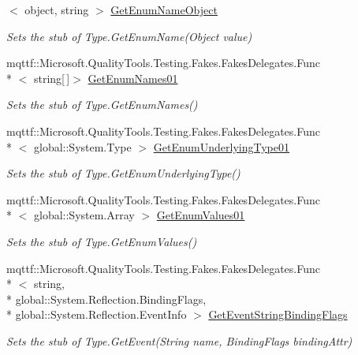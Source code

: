 \begin{DoxyCompactItemize}
$<$ object, string $>$ \hyperlink{class_system_1_1_fakes_1_1_stub_type_aa7c481bc636ea05c398e32ee2386e210}{Get\-Enum\-Name\-Object}
\begin{DoxyCompactList}\small\item\em Sets the stub of Type.\-Get\-Enum\-Name(\-Object value)\end{DoxyCompactList}\item 
mqttf\-::\-Microsoft.\-Quality\-Tools.\-Testing.\-Fakes.\-Fakes\-Delegates.\-Func\\*
$<$ string\mbox{[}$\,$\mbox{]}$>$ \hyperlink{class_system_1_1_fakes_1_1_stub_type_a973c211d65e90adb1b25fa3fb7922e50}{Get\-Enum\-Names01}
\begin{DoxyCompactList}\small\item\em Sets the stub of Type.\-Get\-Enum\-Names()\end{DoxyCompactList}\item 
mqttf\-::\-Microsoft.\-Quality\-Tools.\-Testing.\-Fakes.\-Fakes\-Delegates.\-Func\\*
$<$ global\-::\-System.\-Type $>$ \hyperlink{class_system_1_1_fakes_1_1_stub_type_a9e8d3d2beb9b7497dbb9e520d9440d39}{Get\-Enum\-Underlying\-Type01}
\begin{DoxyCompactList}\small\item\em Sets the stub of Type.\-Get\-Enum\-Underlying\-Type()\end{DoxyCompactList}\item 
mqttf\-::\-Microsoft.\-Quality\-Tools.\-Testing.\-Fakes.\-Fakes\-Delegates.\-Func\\*
$<$ global\-::\-System.\-Array $>$ \hyperlink{class_system_1_1_fakes_1_1_stub_type_abbf271b06a3e60cccf65017d9854d742}{Get\-Enum\-Values01}
\begin{DoxyCompactList}\small\item\em Sets the stub of Type.\-Get\-Enum\-Values()\end{DoxyCompactList}\item 
mqttf\-::\-Microsoft.\-Quality\-Tools.\-Testing.\-Fakes.\-Fakes\-Delegates.\-Func\\*
$<$ string, \\*
global\-::\-System.\-Reflection.\-Binding\-Flags, \\*
global\-::\-System.\-Reflection.\-Event\-Info $>$ \hyperlink{class_system_1_1_fakes_1_1_stub_type_abf98cbf3d5c29000dda1b6edb2194f01}{Get\-Event\-String\-Binding\-Flags}
\begin{DoxyCompactList}\small\item\em Sets the stub of Type.\-Get\-Event(\-String name, Binding\-Flags binding\-Attr)\end{DoxyCompactList}\item 

\end{DoxyCompactItemize}
